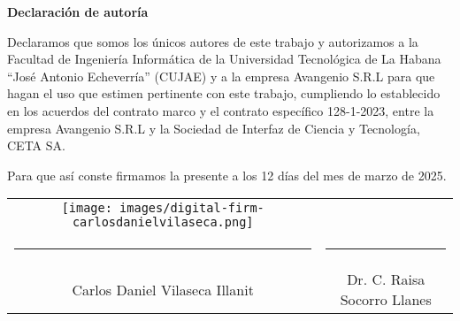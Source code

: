 {\Large \textbf{Declaración de autoría} \vspace{.3cm}}

Declaramos que somos los únicos autores de este trabajo y autorizamos a la Facultad de Ingeniería Informática de la Universidad Tecnológica de La Habana “José Antonio Echeverría” (CUJAE) y a la empresa Avangenio S.R.L para que hagan el uso que estimen pertinente con este trabajo, cumpliendo lo establecido en los acuerdos del contrato marco y el contrato específico 128-1-2023, entre la empresa Avangenio S.R.L y la Sociedad de Interfaz de Ciencia y Tecnología, CETA SA.

Para que así conste firmamos la presente a los 12 días del mes de marzo de 2025.

\vspace{3cm}

\begingroup

\setlength{\tabcolsep}{10pt}
\renewcommand{\arraystretch}{0.5}
\centering
\begin{tabular}{c c}
	\texttt{[image: images/digital-firm-carlosdanielvilaseca.png]} &                                   \\
	\noindent\rule{6cm}{0.4pt}                                                & \noindent\rule{6cm}{0.4pt}        \\
	Carlos Daniel Vilaseca Illanit                                            & Dr. C. Raisa Socorro Llanes
\end{tabular}
\vspace{3cm}

\endgroup

